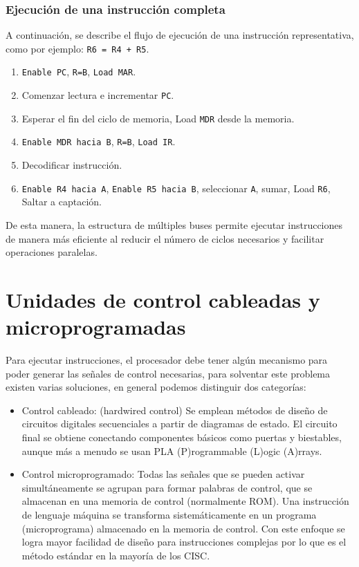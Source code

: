 \subsubsection*{Ejecución de una instrucción completa}
A continuación, se describe el flujo de ejecución de una instrucción representativa, como por ejemplo: \texttt{R6 = R4 + R5}.
\begin{enumerate}
    \item \texttt{Enable PC}, \texttt{R=B}, \texttt{Load MAR}.
    \item Comenzar lectura e incrementar \texttt{PC}.
    \item Esperar el fin del ciclo de memoria, Load \texttt{MDR} desde la memoria.
    \item \texttt{Enable MDR hacia B}, \texttt{R=B}, \texttt{Load IR}.
    \item Decodificar instrucción.
    \item \texttt{Enable R4 hacia A}, \texttt{Enable R5 hacia B}, seleccionar \texttt{A}, sumar, Load \texttt{R6}, Saltar a captación.
\end{enumerate}

De esta manera, la estructura de múltiples buses permite ejecutar instrucciones de manera más eficiente al reducir el número de ciclos 
necesarios y facilitar operaciones paralelas.
\section{Unidades de control cableadas y microprogramadas}
Para ejecutar instrucciones, el procesador debe tener algún mecanismo
para poder generar las señales de control necesarias, para solventar este problema 
existen varias soluciones, en general podemos distinguir dos categorías:
\begin{itemize}
    \item Control cableado: (hardwired control) Se emplean métodos de diseño de circuitos digitales secuenciales a partir de diagramas de estado.
        El circuito final se obtiene conectando componentes básicos como puertas y biestables, aunque más a menudo se usan PLA (P)rogrammable (L)ogic (A)rrays.
    \item Control microprogramado: Todas las señales que se pueden activar simultáneamente se agrupan para formar palabras de control, que se almacenan en una memoria 
        de control (normalmente ROM). Una instrucción de lenguaje máquina se transforma sistemáticamente en un programa (microprograma) almacenado en la memoria de control.
        Con este enfoque se logra mayor facilidad de diseño para instrucciones complejas por lo que es el método estándar en la mayoría de los CISC.
\end{itemize}
